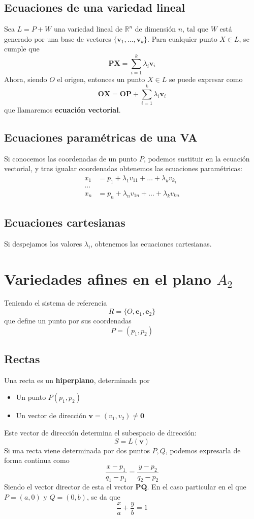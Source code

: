 \documentclass{./Geometria.tex}
\begin{document}
\subsection{Ecuaciones de una variedad lineal}
Sea $L=P+W$ una variedad lineal de $\mathbb{R}^{n}$ de dimensión $n$, tal que $W$ está generado por una base de vectores $\{ \mathbf{v}_{1},\dots ,\mathbf{v}_{k} \}$. Para cualquier punto $X \in L$, se cumple que
\[
	\mathbf{PX}= \sum_{i=1}^{k} \lambda_{i} \mathbf{v}_{i}
\]
Ahora, siendo $O$ el origen, entonces un punto $X \in L$ se puede expresar como
\[
	\mathbf{OX} = \mathbf{OP} + \sum_{i=1}^{k} \lambda_{i} \mathbf{v}_{i}
\]
que llamaremos \textbf{ecuación vectorial}.
\subsection{Ecuaciones paramétricas de una VA}
Si conocemos las coordenadas de un punto $P$, podemos sustituir en la ecuación vectorial, y tras igualar coordenadas obtenemos las ecuaciones paramétricas:
\begin{equation*}
	\begin{split}
		x_1 &= p_1 + \lambda_1v_{11}+\dots +\lambda_{k}v_{k_1}\\
		\dots \\
		x_{n} &= p_{n} + \lambda_{n}v_{1n} + \dots +\lambda_{k}v_{kn}
	\end{split}
\end{equation*}
\subsection{Ecuaciones cartesianas}
Si despejamos los valores $\lambda_{i}$, obtenemos las ecuaciones cartesianas.
\section{Variedades afines en el plano $A_{2}$ }
Teniendo el sistema de referencia
\[
	R = \{ O, \mathbf{e}_{1}, \mathbf{e}_{2} \}
\]
que define un punto por sus coordenadas
\[
	P=(p_1,p_2)
\]
\subsection{Rectas}
Una recta es un \textbf{hiperplano}, determinada por
\begin{itemize}
	\item Un punto $P(p_1,p_2)$
	\item Un vector de dirección $\mathbf{v}=(v_1,v_2) \neq \mathbf{0}$ 
\end{itemize}
Este vector de dirección determina el subespacio de dirección:
\[
	S=L(\mathbf{v})
\]
Si una recta viene determinada por dos puntos $P,Q$, podemos expresarla de forma continua como
\[
	\frac{x-p_1}{q_1-p_1}= \frac{y-p_2}{q_2-p_2}
\]
Siendo el vector director de esta el vector $\mathbf{PQ}$. En el caso particular en el que $P=(a, 0)$ y $Q=(0,b)$, se da que
\[
	\frac{x}{a}+\frac{y}{b}=1
\]
\end{document}
